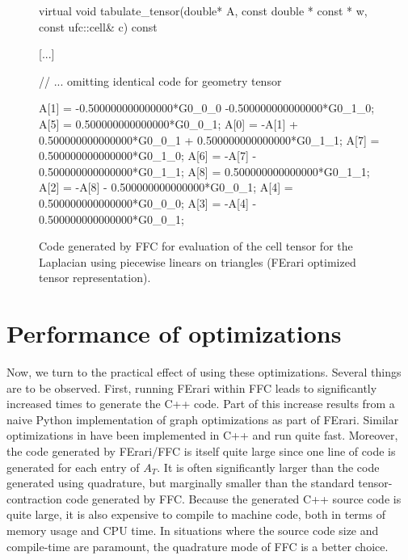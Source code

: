 \begin{figure}
\bwfig
  \scriptsize
  \begin{c++}
virtual void tabulate_tensor(double* A,
                             const double * const * w,
                             const ufc::cell& c) const
{
  [...]

  // ... omitting identical code for geometry tensor

  A[1] = -0.500000000000000*G0_0_0
         -0.500000000000000*G0_1_0;
  A[5] = 0.500000000000000*G0_0_1;
  A[0] = -A[1] +
         0.500000000000000*G0_0_1 +
         0.500000000000000*G0_1_1;
  A[7] = 0.500000000000000*G0_1_0;
  A[6] = -A[7] - 0.500000000000000*G0_1_1;
  A[8] = 0.500000000000000*G0_1_1;
  A[2] = -A[8] - 0.500000000000000*G0_0_1;
  A[4] = 0.500000000000000*G0_0_0;
  A[3] = -A[4] - 0.500000000000000*G0_0_1;
}
  \end{c++}
  \caption{Code generated by FFC for evaluation of the cell tensor for
    the Laplacian using piecewise linears on triangles (FErari
    optimized tensor representation).}
  \label{fig:code,poisson,optimized}
\end{figure}

\section{Performance of optimizations}

Now, we turn to the practical effect of using these optimizations.
Several things are to be observed. First, running FErari within FFC
leads to significantly increased times to generate the C++ code. Part
of this increase results from a naive Python implementation of graph
optimizations as part of FErari. Similar optimizations
in \citet{WolfHeath2009} have been implemented in C++ and run quite
fast. Moreover, the code generated by FErari/FFC is itself quite large
since one line of code is generated for each entry of $A_T$. It is
often significantly larger than the code generated using quadrature,
but marginally smaller than the standard tensor-contraction code
generated by FFC. Because the generated C++ source code is quite
large, it is also expensive to compile to machine code, both in terms
of memory usage and CPU time. In situations where the source code size
and compile-time are paramount, the quadrature mode of FFC is a better
choice.

